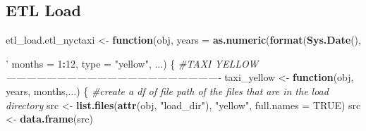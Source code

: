 \documentclass[12pt,twoside]{reedthesis}
\newenvironment{Shaded}{\begin{snugshade}}{\end{snugshade}}
\newcommand{\KeywordTok}[1]{\textcolor[rgb]{0.13,0.29,0.53}{\textbf{#1}}}
\newcommand{\DataTypeTok}[1]{\textcolor[rgb]{0.13,0.29,0.53}{#1}}
\newcommand{\DecValTok}[1]{\textcolor[rgb]{0.00,0.00,0.81}{#1}}
\newcommand{\StringTok}[1]{\textcolor[rgb]{0.31,0.60,0.02}{#1}}
\newcommand{\CommentTok}[1]{\textcolor[rgb]{0.56,0.35,0.01}{\textit{#1}}}
\newcommand{\OtherTok}[1]{\textcolor[rgb]{0.56,0.35,0.01}{#1}}
\newcommand{\ControlFlowTok}[1]{\textcolor[rgb]{0.13,0.29,0.53}{\textbf{#1}}}
\newcommand{\OperatorTok}[1]{\textcolor[rgb]{0.81,0.36,0.00}{\textbf{#1}}}
\newcommand{\NormalTok}[1]{#1}
\theoremstyle{definition}
\theoremstyle{definition}
\theoremstyle{definition}
\theoremstyle{remark}
\begin{document}
\subsection{ETL Load}\label{etl-load}
\begin{Shaded}
\begin{Highlighting}[]
\NormalTok{etl_load.etl_nyctaxi <-}\StringTok{ }\ControlFlowTok{function}\NormalTok{(obj, }\DataTypeTok{years =} \KeywordTok{as.numeric}\NormalTok{(}\KeywordTok{format}\NormalTok{(}\KeywordTok{Sys.Date}\NormalTok{(),}\StringTok{'%
                                 \DataTypeTok{months =} \DecValTok{1}\OperatorTok{:}\DecValTok{12}\NormalTok{, }
                                 \DataTypeTok{type  =} \StringTok{"yellow"}\NormalTok{, ...) \{}
  \CommentTok{#TAXI YELLOW----------------------------------------------------------------}
\NormalTok{  taxi_yellow <-}\StringTok{ }\ControlFlowTok{function}\NormalTok{(obj, years, months,...) \{}
    \CommentTok{#create a df of file path of the files that are in the load directory}
\NormalTok{    src <-}\StringTok{ }\KeywordTok{list.files}\NormalTok{(}\KeywordTok{attr}\NormalTok{(obj, }\StringTok{"load_dir"}\NormalTok{), }\StringTok{"yellow"}\NormalTok{, }\DataTypeTok{full.names =} \OtherTok{TRUE}\NormalTok{)}
\NormalTok{    src <-}\StringTok{ }\KeywordTok{data.frame}\NormalTok{(src)}
    
}
\end{Highlighting}
\end{Shaded}
\end{document}
